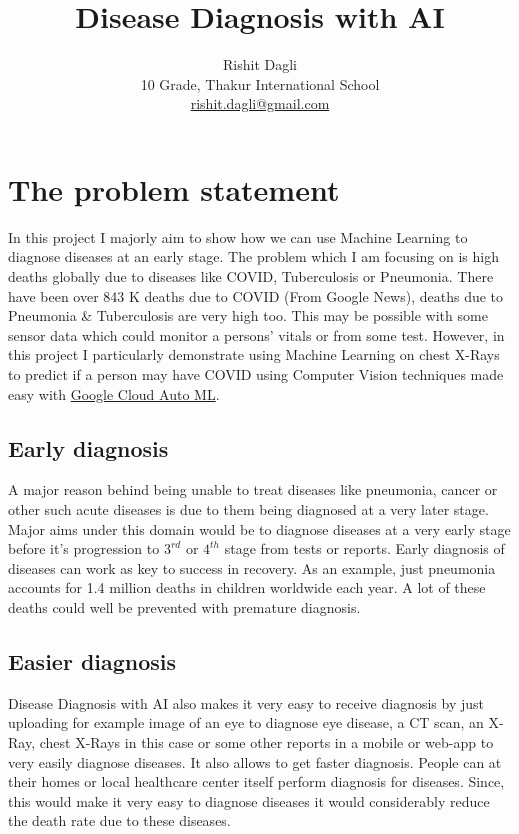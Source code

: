 \documentclass[a4paper]{article}
\title{Disease Diagnosis with AI}
\author{Rishit Dagli \\ 
        10 Grade, Thakur International School \\
        \href{mailto:rishit.dagli@gmail.com}{rishit.dagli@gmail.com} }
\date{}
\begin{document}
\maketitle

\section{The problem statement}

In this project I majorly aim to show how we can use Machine Learning to diagnose diseases at an early stage. The problem which I am focusing on is high deaths globally due to diseases like COVID, Tuberculosis or Pneumonia. There have been over 843 K deaths due to COVID (From Google News), deaths due to Pneumonia \& Tuberculosis are very high too. This may be possible with some sensor data which could monitor a persons' vitals or from some test. However, in this project I particularly demonstrate using Machine Learning on chest X-Rays to predict if a person may have COVID using Computer Vision techniques made easy with \href{https://cloud.google.com/automl}{Google Cloud Auto ML}.

\subsection{Early diagnosis}

\qquad A major reason behind being unable to treat diseases like pneumonia, cancer or other such acute diseases is due to them being diagnosed at a very later stage. Major aims under this domain would be to diagnose diseases at a very early stage before it's progression to $3^{rd}$ or $4^{th}$ stage from tests or reports. Early diagnosis of diseases can work as key to success in recovery. As an example, just pneumonia accounts for 1.4 million deaths in children worldwide each year. A lot of these deaths could well be prevented with premature diagnosis. 

\subsection{Easier diagnosis}

\qquad Disease Diagnosis with AI also makes it very easy to receive diagnosis by just uploading for example image of an eye to diagnose eye disease, a CT scan, an X-Ray, chest X-Rays in this case or some other reports in a mobile or web-app to very easily diagnose diseases. It also allows to get faster diagnosis. People can at their homes or local healthcare center itself perform diagnosis for diseases. Since, this would make it very easy to diagnose diseases it would considerably reduce the death rate due to these diseases.
\end{document}
